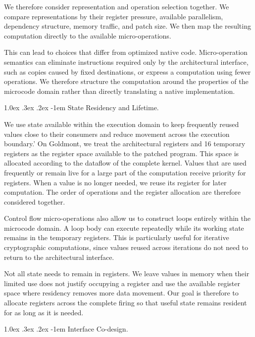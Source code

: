 \documentclass[journal=tches,submission]{iacrtrans}
\makeatletter
\renewcommand\paragraph{\@startsection{paragraph}{4}{\z@}%
      {1.0ex \@plus .3ex \@minus .2ex}%
      {-1em}%
      {\normalfont\normalsize\bfseries\SS@parafont}}
\makeatother
\begin{document}
We therefore consider representation and operation selection together.
We compare representations by their register pressure, available parallelism, dependency structure, memory traffic, and patch size.
We then map the resulting computation directly to the available micro-operations.

This can lead to choices that differ from optimized native code.
Micro-operation semantics can eliminate instructions required only by the architectural interface, such as copies caused by fixed destinations, or express a computation using fewer operations.
We therefore structure the computation around the properties of the microcode domain rather than directly translating a native implementation.

\paragraph{State Residency and Lifetime.}
\label{sec:method-residency}

We use state available within the execution domain to keep frequently reused values close to their consumers and reduce movement across the execution boundary.'
On Goldmont, we treat the architectural registers and 16 temporary registers as the register space available to the patched program.
This space is allocated according to the dataflow of the complete kernel.
Values that are used frequently or remain live for a large part of the computation receive priority for registers.
When a value is no longer needed, we reuse its register for later computation.
The order of operations and the register allocation are therefore considered together.

Control flow micro-operations also allow us to construct loops entirely within the microcode domain.
A loop body can execute repeatedly while its working state remains in the temporary registers.
This is particularly useful for iterative cryptographic computations, since values reused across iterations do not need to return to the architectural interface.

Not all state needs to remain in registers.
We leave values in memory when their limited use does not justify occupying a register and use the available register space where residency removes more data movement.
Our goal is therefore to allocate registers across the complete firing so that useful state remains resident for as long as it is needed.

\paragraph{Interface Co-design.}
\label{sec:method-interface}
\end{document}
